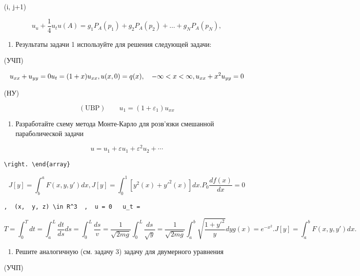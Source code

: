 \documentclass[
  ukrainian,
]{article}
\providecommand{\tightlist}{%
  \setlength{\itemsep}{0pt}\setlength{\parskip}{0pt}}
\begin{document}
(i, j+1)

\[
u_u + \frac{1}{4} u_t
u(A) = g_1 P_A(p_1) + g_2 P_A(p_2) + \dots + g_N P_A(p_N),
\]

\begin{enumerate}
\def\labelenumi{\arabic{enumi}.}
\setcounter{enumi}{1}
\tightlist
\item
  Результаты задачи 1 используйте для решения следующей задачи:
\end{enumerate}

(УЧП)

\[
u_{xx} + u_{yy} = 0
u_t = (1+x) u_{xx}, \\ u(x, 0) = q(x), \quad -\infty < x < \infty,
u_{xx} + x^2 u_{yy} = 0
\]

(НУ)

\[
(\text{UBP}) \qquad
u_1 = (1 + \varepsilon_1) u_{xx}
\]

\begin{enumerate}
\def\labelenumi{\arabic{enumi}.}
\setcounter{enumi}{4}
\tightlist
\item
  Разработайте схему метода Монте-Карло для розв'язки смешанной
  параболической задачи
\end{enumerate}

\[
u = u_1 + \varepsilon u_1 + \varepsilon^2 u_2 + \cdots
\]

\begin{verbatim}
\right. \end{array}
\end{verbatim}

\[
J[y] = \int_{b}^{a} F(x, y, y') dx,
J[y] = \int_{0}^{1} [y^{2}(x) + y'^{2}(x)] dx.
P_{0}
\frac{df(x)}{dx} = 0
\]

\begin{verbatim}
,  (x,  y, z) \in R^3  ,  u = 0   u_t =
\end{verbatim}

\[
T = \int_{0}^{T} dt = \int_{a}^{L} \frac{dt}{ds} ds = \int_{0}^{L} \frac{ds}{v} = \frac{1}{\sqrt{2mg}} \int_{0}^{L} \frac{ds}{\sqrt{y}} = \frac{1}{\sqrt{2mg}} \int_{a}^{b} \sqrt{\frac{1+y'^{2}}{y}} dy
g(x) = e^{-x^2}.
J[y] = \int_{a}^{b} F(x, y, y') dx.
\]

\begin{enumerate}
\def\labelenumi{\arabic{enumi}.}
\setcounter{enumi}{3}
\tightlist
\item
  Решите аналогичную (см. задачу 3) задачу для двумерного уравнения
\end{enumerate}

(УЧП)
\end{document}
